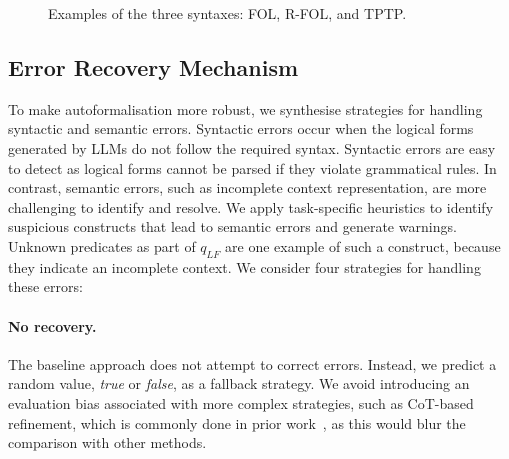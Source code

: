 \begin{figure}[t]
    \centering
    \scriptsize
    \caption{Examples of the three syntaxes: FOL, R-FOL, and TPTP.}
    \label{fig:formalisation_example}
\end{figure}

\subsection{Error Recovery Mechanism}
To make autoformalisation more robust, we synthesise strategies for handling syntactic and semantic errors. Syntactic errors occur when the logical forms generated by \acp{LLM} do not follow the required syntax. Syntactic errors are easy to detect as logical forms cannot be parsed if they violate grammatical rules. In contrast, semantic errors, such as incomplete context representation, are more challenging to identify and resolve. We apply task-specific heuristics to identify suspicious constructs that lead to semantic errors and generate warnings. Unknown predicates as part of $q_{LF}$ are one example of such a construct, because they indicate an incomplete context. 
We consider four strategies for handling these errors:

\paragraph{No recovery.} The baseline approach does not attempt to correct errors. Instead, we predict a random value, \emph{true} or \emph{false}, as a fallback strategy. We avoid introducing an evaluation bias associated with more complex strategies, such as \ac{CoT}-based refinement, which is commonly done in prior work~\cite{liangming_pan_logiclm_2023,kirtania_logic-lm_2024}, as this would blur the comparison with other methods.
